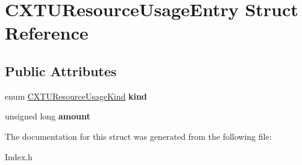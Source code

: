 \hypertarget{structCXTUResourceUsageEntry}{}\section{C\+X\+T\+U\+Resource\+Usage\+Entry Struct Reference}
\label{structCXTUResourceUsageEntry}
\subsection*{Public Attributes}
\begin{DoxyCompactItemize}
\item 
\mbox{\label{structCXTUResourceUsageEntry_a32b8e77e7deef645fab9dddca0404c95}} 
enum \mbox{\hyperlink{group__CINDEX__TRANSLATION__UNIT_ga13810240df7c205de04daac58f956396}{C\+X\+T\+U\+Resource\+Usage\+Kind}} {\bfseries kind}
\item 
\mbox{\label{structCXTUResourceUsageEntry_adb8ed4afc1ece830d371f62f3d0963aa}} 
unsigned long {\bfseries amount}
\end{DoxyCompactItemize}


The documentation for this struct was generated from the following file\+:\begin{DoxyCompactItemize}
\item 
Index.\+h\end{DoxyCompactItemize}
